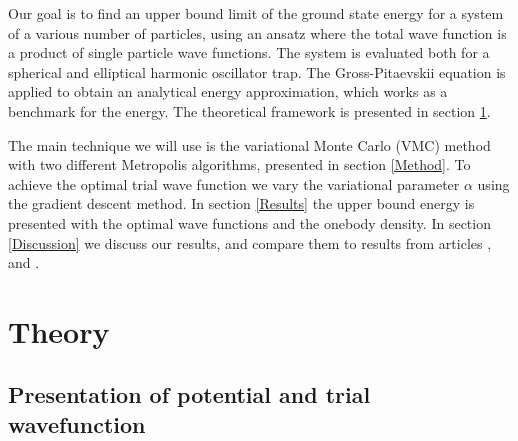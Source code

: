 \documentclass[norsk,a4paper,12pt]{article}
\begin{document}
Our goal is to find an upper bound limit of the ground state energy for a system of a various number of particles, using an ansatz where the total wave function is a product of single particle wave functions. The system is evaluated both for a spherical and elliptical harmonic oscillator trap. The Gross-Pitaevskii equation is applied to obtain an analytical energy approximation, which works as a benchmark for the energy. The theoretical framework is presented in section \ref{Theory}. \par

The main technique we will use is the variational Monte Carlo (VMC) method with two different Metropolis algorithms, presented in section \ref{Method}. To achieve the optimal trial wave function we vary the variational parameter $\alpha$ using the gradient descent method. In section \ref{Results} the upper bound energy is presented with the optimal wave functions and the onebody density. In section \ref{Discussion} we discuss our results, and compare them to results from articles \cite{DuBois}, \cite{Nilsen} and \cite{Dalfovo}.


\section{Theory} \label{Theory}

\subsection{Presentation of potential and trial wavefunction} 
\end{document}
